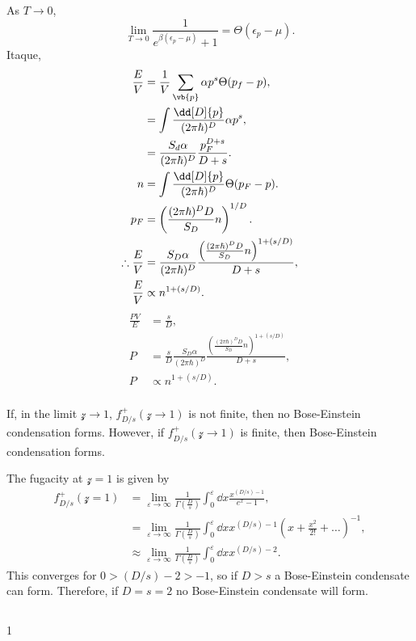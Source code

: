 \documentclass[a4paper,12pt,twoside]{article}
\newcommand{\mcols}{0}
\begin{document}
\begin{multicols*}{2}
\subsubsection{}
As $T\rightarrow 0$,
\begin{equation}
	\lim_{T\rightarrow 0} \frac{1}{e^{\beta(\epsilon_p-\mu)}+1} = \Theta(\epsilon_p - \mu).
\end{equation}
Itaque,
\begin{align}
	\frac{E}{V} &= \frac{1}{V} \sum_{\vb{p}} \alpha p^s \Theta(p_f-p),\\
	&= \int \frac{\dd[D]{p}}{(2\pi\hbar)^D} \alpha p^s,\\
	&= \frac{S_d\alpha}{(2\pi\hbar)^D} \frac{p_F^{D+s}}{D+s}.\\
	n &= \int \frac{\dd[D]{p}}{(2\pi\hbar)^D} \Theta(p_F - p).\\
	p_F &= \left(\frac{(2\pi\hbar)^D D}{S_D} n\right)^{1/D}.\\
	\therefore
	\frac{E}{V} &= \frac{S_D\alpha}{(2\pi\hbar)^D} \frac{\left(\frac{(2\pi\hbar)^D D}{S_D} n\right)^{1+(s/D)}}{D+s},\\
	\frac{E}{V} &\propto n^{1+(s/D)}.
\end{align}
\begin{align}
	\frac{PV}{E} &= \frac{s}{D},\\
	P &= \frac{s}{D}\frac{S_D\alpha}{(2\pi\hbar)^D} \frac{\left(\frac{(2\pi\hbar)^D D}{S_D} n\right)^{1+(s/D)}}{D+s},\\
	P &\propto n^{1+(s/D)}.
\end{align}
\subsubsection{}
If, in the limit $\mathcal{z} \rightarrow 1$, $f_{D/s}^+(\mathcal{z} \rightarrow 1)$ is not finite, then no Bose-Einstein condensation forms.
However, if $f_{D/s}^+(\mathcal{z} \rightarrow 1)$ is finite, then Bose-Einstein condensation forms.

The fugacity at $\mathcal{z} = 1$ is given by
\begin{align}
	f_{D/s}^+(\mathcal{z}=1) &= \lim_{\varepsilon \rightarrow\infty} \frac{1}{\Gamma\left(\frac{D}{s}\right)} \int_0^\varepsilon \dd{x} \frac{x^{(D/s)-1}}{e^x-1},\\
	&= \lim_{\varepsilon \rightarrow\infty}\frac{1}{\Gamma\left(\frac{D}{s}\right)} \int_0^\varepsilon \dd{x} x^{(D/s)-1} \left(x+\frac{x^2}{2!} + \dots\right)^{-1},\\
	&\approx \lim_{\varepsilon \rightarrow\infty} \frac{1}{\Gamma\left(\frac{D}{s}\right)} \int_0^\varepsilon \dd{x} x^{(D/s)-2}.
\end{align}
This converges for $0 > (D/s)-2 > -1$, so if $D > s$ a Bose-Einstein condensate can form.
Therefore, if $D = s = 2$ no Bose-Einstein condensate will form.

\subsection{}


\printBib


\if\mcols1
\end{multicols*}
\fi
\end{document}
